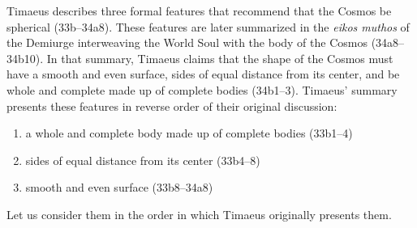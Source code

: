 Timaeus describes three formal features that recommend that the Cosmos be spherical (33b--34a8). These features are later summarized in the \emph{eikos muthos} of the Demiurge interweaving the World Soul with the body of the Cosmos (34a8--34b10). In that summary, Timaeus claims that the shape of the Cosmos must have a smooth and even surface, sides of equal distance from its center, and be whole and complete made up of complete bodies (34b1--3). Timaeus' summary presents these features in reverse order of their original discussion:
\begin{enumerate}[(1)]
	\item a whole and complete body made up of complete bodies (33b1--4)
	\item sides of equal distance from its center (33b4--8)
	\item smooth and even surface (33b8--34a8)
\end{enumerate}
Let us consider them in the order in which Timaeus originally presents them.

